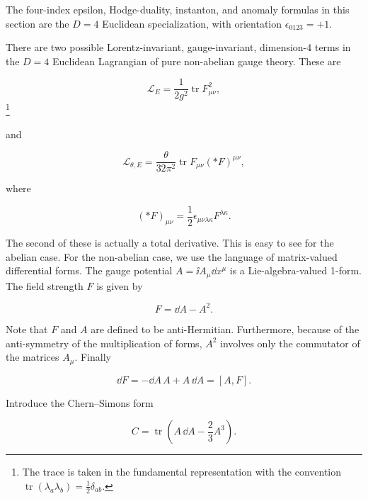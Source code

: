 The four-index epsilon, Hodge-duality, instanton, and anomaly formulas in this
section are the $D=4$ Euclidean specialization, with orientation
$\epsilon_{0123}=+1$.

There are two possible Lorentz-invariant, gauge-invariant, dimension-4 terms in
the $D=4$ Euclidean Lagrangian of pure non-abelian gauge theory. These are

\begin{equation}
  \mathcal L_E=\frac{1}{2g^2}\operatorname{tr}F_{\mu\nu}^2,
  \label{eq:10.7}
\end{equation}
\footnote[9]{The trace is taken in the fundamental representation with the
convention $\operatorname{tr}(\lambda_a\lambda_b)=\tfrac12\delta_{ab}$.}

and

\begin{equation}
  \mathcal L_{\theta,E}=\frac{\theta}{32\pi^2}
  \operatorname{tr}F_{\mu\nu}(\ast F)^{\mu\nu},
  \label{eq:10.8}
\end{equation}

where

\begin{equation}
  (\ast F)_{\mu\nu}=\frac12\epsilon_{\mu\nu\lambda\kappa}F^{\lambda\kappa}.
  \label{eq:10.9}
\end{equation}

The second of these is actually a total derivative. This is easy to see for the
abelian case. For the non-abelian case, we use the language of matrix-valued
differential forms. The gauge potential $A=\ii A_\mu\dd x^\mu$ is a
Lie-algebra-valued 1-form. The field strength $F$ is given by

\[
  F=\dd A-A^2.
\]

Note that $F$ and $A$ are defined to be anti-Hermitian. Furthermore, because of
the anti-symmetry of the multiplication of forms, $A^2$ involves only the
commutator of the matrices $A_\mu$. Finally

\[
  \dd F=-\dd A\,A+A\,\dd A=[A,F].
\]

Introduce the Chern--Simons form

\[
  C=\operatorname{tr}\left(A\,\dd A-\frac23A^3\right).
\]

